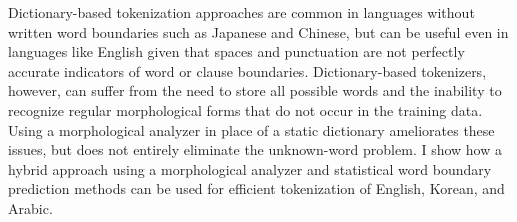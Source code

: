 Dictionary-based tokenization approaches are common in languages without written word boundaries such as Japanese and Chinese, but can be useful even in languages like English given that spaces and punctuation are not perfectly accurate indicators of word or clause boundaries. Dictionary-based tokenizers, however, can suffer from the need to store all possible words and the inability to recognize regular morphological forms that do not occur in the training data. Using a morphological analyzer in place of a static dictionary ameliorates these issues, but does not entirely eliminate the unknown-word problem. I show how a hybrid approach using a morphological analyzer and statistical word boundary prediction methods can be used for efficient tokenization of English, Korean, and Arabic. 